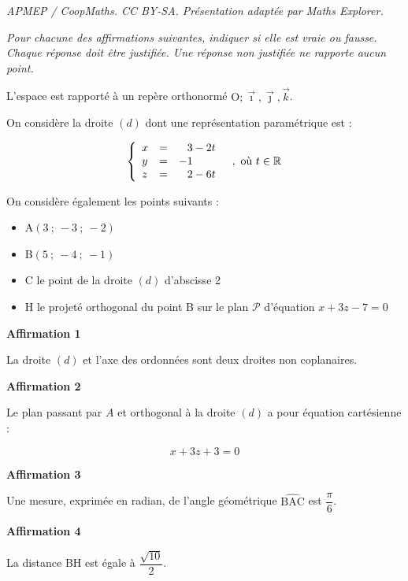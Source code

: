 \documentclass[10pt]{article}
\providecommand{\R}{\mathbb{R}}
\providecommand{\Oijk}{\(\mathrm{O};\vec{\imath},\vec{\jmath},\vec{k}\)}
\begin{document}
\noindent\textit{APMEP / CoopMaths. CC BY-SA. Présentation adaptée par Maths Explorer.}\par\medskip
\medskip

\emph{Pour chacune des affirmations suivantes, indiquer si elle est vraie ou fausse. Chaque réponse doit être justifiée. Une réponse non justifiée ne rapporte aucun point.}

\medskip

L'espace est rapporté à un repère orthonormé \Oijk.

On considère la droite $(d)$ dont une représentation paramétrique est :


\[\left\{\begin{array}{l c l}
x&=&\phantom{-}3 - 2 t \\
y&=&-1 \\
z&=&\phantom{-}2 - 6 t
\end{array} \quad, \text { où } t \in \R\right.\]

On considère également les points suivants :

\begin{itemize}
\item A$(3~;~-3~;~-2)$
\item B$(5~;~-4~;~-1)$
\item C le point de la droite $(d)$ d'abscisse 2
\item H le projeté orthogonal du point B sur le plan $\mathcal{P}$ d'équation $x + 3z -7 = 0$
\end{itemize}

\medskip

\textbf{Affirmation 1}

La droite $(d)$ et l'axe des ordonnées sont deux droites non coplanaires.

\bigskip

\textbf{Affirmation 2}

Le plan passant par $A$ et orthogonal à la droite $(d)$ a pour équation cartésienne :

\[x + 3z + 3= 0\]

\bigskip

\textbf{Affirmation 3}

Une mesure, exprimée en radian, de l'angle géométrique $\widehat{\mathrm{BAC}}$ est $\dfrac{\pi}{6}$.

\bigskip

\textbf{Affirmation 4}

La distance BH est égale à $\dfrac{\sqrt{10}}{2}$.
\end{document}
